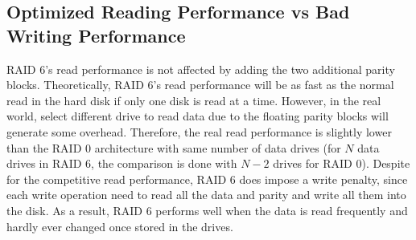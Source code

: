 \subsection{Optimized Reading Performance vs Bad Writing Performance}
RAID 6’s read performance is not affected by adding the two additional parity blocks. Theoretically, RAID 6’s read performance will be as fast as the normal read in the hard disk if only one disk is read at a time. However, in the real world, select different drive to read data due to the floating parity blocks will generate some overhead. Therefore, the real read performance is slightly lower than the RAID 0 architecture with same number of data drives (for $N$ data drives in RAID 6, the comparison is done with $N-2$ drives for RAID 0).
Despite for the competitive read performance, RAID 6 does impose a write penalty, since each write operation need to read all the data and parity and write all them into the disk. As a result, RAID 6 performs well when the data is read frequently and hardly ever changed once stored in the drives.
